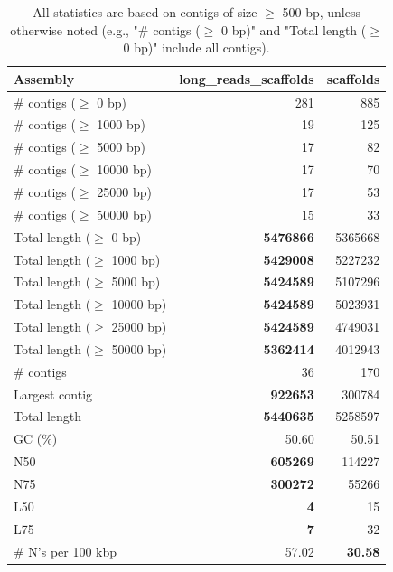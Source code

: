 \documentclass[12pt,a4paper]{article}
\begin{document}
\begin{table}[ht]
\begin{center}
\caption{All statistics are based on contigs of size $\geq$ 500 bp, unless otherwise noted (e.g., "\# contigs ($\geq$ 0 bp)" and "Total length ($\geq$ 0 bp)" include all contigs).}
\begin{tabular}{|l*{2}{|r}|}
\hline
Assembly & long\_reads\_scaffolds & scaffolds \\ \hline
\# contigs ($\geq$ 0 bp) & 281 & 885 \\ \hline
\# contigs ($\geq$ 1000 bp) & 19 & 125 \\ \hline
\# contigs ($\geq$ 5000 bp) & 17 & 82 \\ \hline
\# contigs ($\geq$ 10000 bp) & 17 & 70 \\ \hline
\# contigs ($\geq$ 25000 bp) & 17 & 53 \\ \hline
\# contigs ($\geq$ 50000 bp) & 15 & 33 \\ \hline
Total length ($\geq$ 0 bp) & {\bf 5476866} & 5365668 \\ \hline
Total length ($\geq$ 1000 bp) & {\bf 5429008} & 5227232 \\ \hline
Total length ($\geq$ 5000 bp) & {\bf 5424589} & 5107296 \\ \hline
Total length ($\geq$ 10000 bp) & {\bf 5424589} & 5023931 \\ \hline
Total length ($\geq$ 25000 bp) & {\bf 5424589} & 4749031 \\ \hline
Total length ($\geq$ 50000 bp) & {\bf 5362414} & 4012943 \\ \hline
\# contigs & 36 & 170 \\ \hline
Largest contig & {\bf 922653} & 300784 \\ \hline
Total length & {\bf 5440635} & 5258597 \\ \hline
GC (\%) & 50.60 & 50.51 \\ \hline
N50 & {\bf 605269} & 114227 \\ \hline
N75 & {\bf 300272} & 55266 \\ \hline
L50 & {\bf 4} & 15 \\ \hline
L75 & {\bf 7} & 32 \\ \hline
\# N's per 100 kbp & 57.02 & {\bf 30.58} \\ \hline
\end{tabular}
\end{center}
\end{table}
\end{document}
